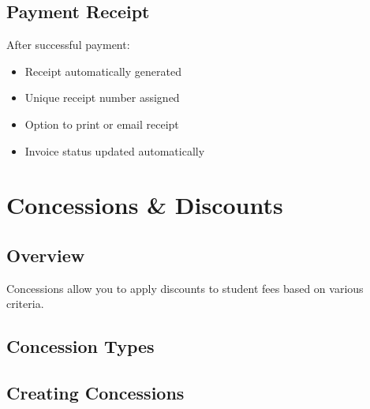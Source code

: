 \documentclass[12pt,a4paper]{report}
\begin{document}
\section{Payment Receipt}

After successful payment:
\begin{itemize}[leftmargin=*]
    \item Receipt automatically generated
    \item Unique receipt number assigned
    \item Option to print or email receipt
    \item Invoice status updated automatically
\end{itemize}

\chapter{Concessions \& Discounts}

\section{Overview}

Concessions allow you to apply discounts to student fees based on various criteria.

\section{Concession Types}

\begin{center}
\end{center}

\section{Creating Concessions}
\end{document}
